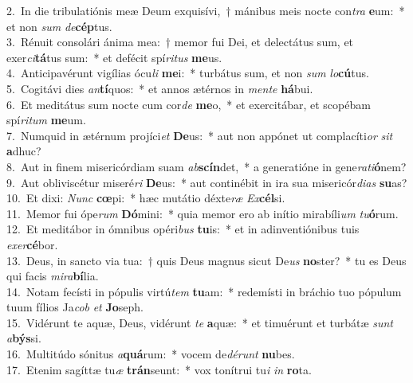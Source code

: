 {2.~}In die tribulatiónis meæ Deum exquisívi,~† mánibus meis nocte con\textit{tra} \textbf{e}um:~* et non \textit{sum} \textit{de}\textbf{cép}tus.\\
{3.~}Rénuit consolári ánima mea:~† memor fui Dei, et delectátus sum, et exer\textit{ci}\textbf{tá}tus sum:~* et defécit spí\textit{ri}\textit{tus} \textbf{me}us.\\
{4.~}Anticipavérunt vigílias ócu\textit{li} \textbf{me}i:~* turbátus sum, et non \textit{sum} \textit{lo}\textbf{cú}tus.\\
{5.~}Cogitávi dies \textit{an}\textbf{tí}quos:~* et annos ætérnos in \textit{men}\textit{te} \textbf{há}bui.\\
{6.~}Et meditátus sum nocte cum cor\textit{de} \textbf{me}o,~* et exercitábar, et scopébam spí\textit{ri}\textit{tum} \textbf{me}um.\\
{7.~}Numquid in ætérnum projíci\textit{et} \textbf{De}us:~* aut non appónet ut complacíti\textit{or} \textit{sit} \textbf{a}dhuc?\\
{8.~}Aut in finem misericórdiam suam \textit{ab}\textbf{scín}det,~* a generatióne in gene\textit{ra}\textit{ti}\textbf{ó}nem?\\
{9.~}Aut obliviscétur miseré\textit{ri} \textbf{De}us:~* aut continébit in ira sua misericór\textit{di}\textit{as} \textbf{su}as?\\
{10.~}Et dixi: \textit{Nunc} \textbf{cœ}pi:~* hæc mutátio déxte\textit{ræ} \textit{Ex}\textbf{cél}si.\\
{11.~}Memor fui ópe\textit{rum} \textbf{Dó}mini:~* quia memor ero ab inítio mirabíli\textit{um} \textit{tu}\textbf{ó}rum.\\
{12.~}Et meditábor in ómnibus opéri\textit{bus} \textbf{tu}is:~* et in adinventiónibus tuis \textit{e}\textit{xer}\textbf{cé}bor.\\
{13.~}Deus, in sancto via tua:~† quis Deus magnus sicut De\textit{us} \textbf{no}ster?~* tu es Deus qui facis \textit{mi}\textit{ra}\textbf{bí}lia.\\
{14.~}Notam fecísti in pópulis virtú\textit{tem} \textbf{tu}am:~* redemísti in bráchio tuo pópulum tuum fílios Ja\textit{cob} \textit{et} \textbf{Jo}seph.\\
{15.~}Vidérunt te aquæ, Deus, vidérunt \textit{te} \textbf{a}quæ:~* et timuérunt et turbátæ \textit{sunt} \textit{a}\textbf{býs}si.\\
{16.~}Multitúdo sónitus \textit{a}\textbf{quá}rum:~* vocem de\textit{dé}\textit{runt} \textbf{nu}bes.\\
{17.~}Etenim sagíttæ tu\textit{æ} \textbf{trán}seunt:~* vox tonítrui tu\textit{i} \textit{in} \textbf{ro}ta.\\
